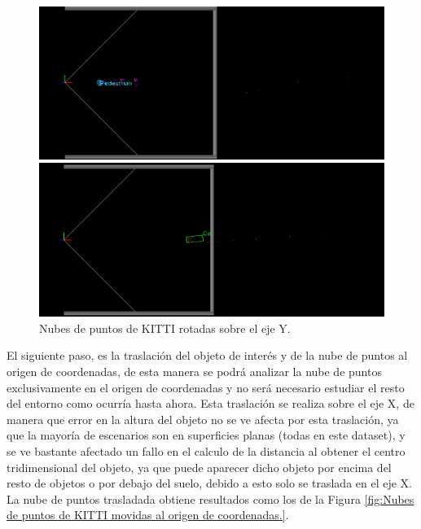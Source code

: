 \begin{figure}[H]
	\begin{minipage}{0.495\textwidth}
		\centering
		\includegraphics[width=1\linewidth]{Book/figures/7_roi/kitti_pcl_rot_0.png}
	\end{minipage}\hfill
	\begin{minipage}{0.495\textwidth}
		\centering
		\includegraphics[width=1\linewidth]{Book/figures/7_roi/kitti_pcl_rot_2.png}
	\end{minipage}
	\caption{Nubes de puntos de KITTI rotadas sobre el eje Y.}
	\label{fig:Nubes de puntos de KITTI rotadas al eje Y.}
\end{figure}

El siguiente paso, es la traslación del objeto de interés y de la nube de puntos al origen de coordenadas, de esta manera se podrá analizar la nube de puntos exclusivamente en el origen de coordenadas y no será necesario estudiar el resto del entorno como ocurría hasta ahora. Esta traslación se realiza sobre el eje X, de manera que error en la altura del objeto no se ve afecta por esta traslación, ya que la mayoría de escenarios son en superficies planas (todas en este dataset), y se ve bastante afectado un fallo en el calculo de la distancia al obtener el centro tridimensional del objeto, ya que puede aparecer dicho objeto por encima del resto de objetos o por debajo del suelo, debido a esto solo se traslada en el eje X. La nube de puntos trasladada obtiene resultados como los de la Figura \ref{fig:Nubes de puntos de KITTI movidas al origen de coordenadas.}.

